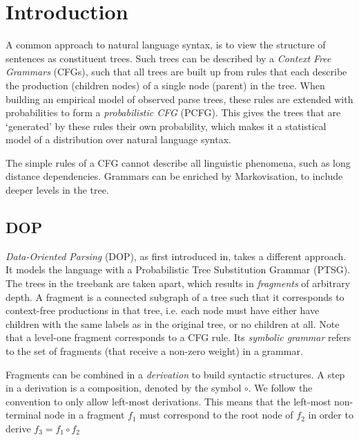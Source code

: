 
\section{Introduction}





A common approach to natural language syntax, is to view the structure of sentences as constituent trees. Such trees can be described by a \emph{Context Free Grammars} (CFGs),  such that all trees are built up from  rules that each describe the production (children nodes) of a single node (parent) in the tree. When building an empirical model of observed parse trees, these rules are extended with probabilities to form a \emph{probabilistic CFG} (PCFG). This gives the trees that are `generated' by these rules their own probability, which makes it a statistical model of a distribution over natural language syntax.

The simple rules of a CFG cannot describe all linguistic phenomena, such as long distance dependencies. Grammars can be enriched by Markovisation, to include deeper levels in the tree. 


\subsection{DOP}
\emph{Data-Oriented Parsing} (DOP), as first introduced in\cite{scha1990}, takes a different approach. It models the language with a Probabilistic Tree Substitution Grammar (PTSG). 
The trees in the treebank are taken apart, which results in \emph{fragments} of arbitrary depth. A fragment is a connected subgraph of a tree such that it corresponds to context-free productions in that tree, i.e. each node must have either have children with the same labels as in the original tree, or no children at all. Note that a level-one fragment corresponds to a CFG rule. Its \emph{symbolic grammar} refers to the set of fragments (that receive a non-zero weight) in a grammar. 

Fragments can be combined in a \emph{derivation} to build syntactic structures. A step in a derivation is a composition, denoted by the symbol $\circ$. We follow the convention to only allow left-most derivations. This means that the left-most non-terminal node in a fragment $f_1$ must correspond to the root node of $f_2$ in order to derive $f_3=f_1\circ f_2$

